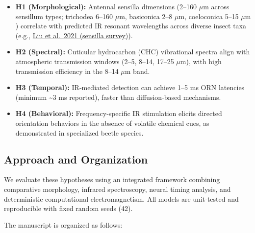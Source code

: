 \documentclass[
  13pt,
  a4paperpaper,
  12pt]{article}
\providecommand{\tightlist}{%
  \setlength{\itemsep}{0pt}\setlength{\parskip}{0pt}}
\begin{document}
\begin{itemize}
\tightlist
\item
  \textbf{H1 (Morphological):} Antennal sensilla dimensions (2--160
  \(\mu\mathrm{m}\) across sensillum types; trichodea 6--160
  \(\mu\mathrm{m}\), basiconica 2--8 \(\mu\mathrm{m}\), coeloconica
  5--15 \(\mu\mathrm{m}\)) correlate with predicted IR resonant
  wavelengths across diverse insect taxa (e.g.,
  \href{https://pmc.ncbi.nlm.nih.gov/articles/PMC7831480/}{Liu et
  al.~2021 (sensilla survey)}).
\item
  \textbf{H2 (Spectral):} Cuticular hydrocarbon (CHC) vibrational
  spectra align with atmospheric transmission windows (2--5, 8--14,
  17--25 \(\mu\mathrm{m}\)), with high transmission efficiency in the
  8--14 \(\mu\mathrm{m}\) band.
\item
  \textbf{H3 (Temporal):} IR‑mediated detection can achieve 1--5 ms ORN
  latencies (minimum \textasciitilde3 ms reported), faster than
  diffusion‑based mechanisms.
\item
  \textbf{H4 (Behavioral):} Frequency‑specific IR stimulation elicits
  directed orientation behaviors in the absence of volatile chemical
  cues, as demonstrated in specialized beetle species.
\end{itemize}

\subsection{Approach and Organization}\label{approach-and-organization}

We evaluate these hypotheses using an integrated framework combining
comparative morphology, infrared spectroscopy, neural timing analysis,
and deterministic computational electromagnetism. All models are
unit-tested and reproducible with fixed random seeds (42).

The manuscript is organized as follows:
\end{document}

